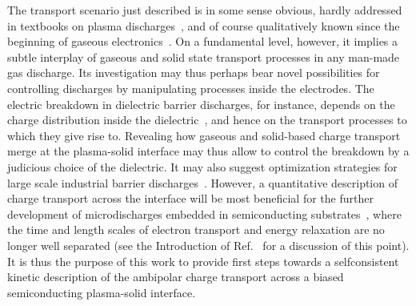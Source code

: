 \documentclass[pre,reprint,floats]{revtex4-1}
\begin{document}
The transport scenario just described is in some sense obvious, hardly addressed in textbooks
on plasma discharges~\cite{Franklin76,LL05}, and of course qualitatively known since the 
beginning of gaseous electronics~\cite{LM24}. On a fundamental level, however, it implies a 
subtle interplay of gaseous and solid state transport processes in any man-made gas discharge. 
Its investigation may thus perhaps bear novel possibilities for controlling discharges by 
manipulating processes inside the electrodes. The electric breakdown in dielectric barrier 
discharges, for instance, depends on the charge distribution inside the 
dielectric~\cite{NTH18,PRS16,WYB05,MSG03}, and hence on the transport processes to which they 
give rise to. Revealing how gaseous and solid-based charge transport merge at the plasma-solid 
interface may thus allow to control the breakdown by a judicious choice of the dielectric. It 
may also suggest optimization strategies for large scale industrial barrier 
discharges~\cite{Kogelschatz03}. However, a quantitative description of charge transport across 
the interface will be most beneficial for the further development of microdischarges embedded 
in semiconducting substrates~\cite{CMS19,EPC13,TWH11,DOL10}, where the time and length scales 
of electron transport and energy relaxation are no longer well separated (see the Introduction
of Ref.~\cite{BF17} for a discussion of this point). It is thus the purpose of this work to 
provide first steps towards a selfconsistent kinetic description of the ambipolar charge 
transport across a biased semiconducting plasma-solid interface.
\end{document}
